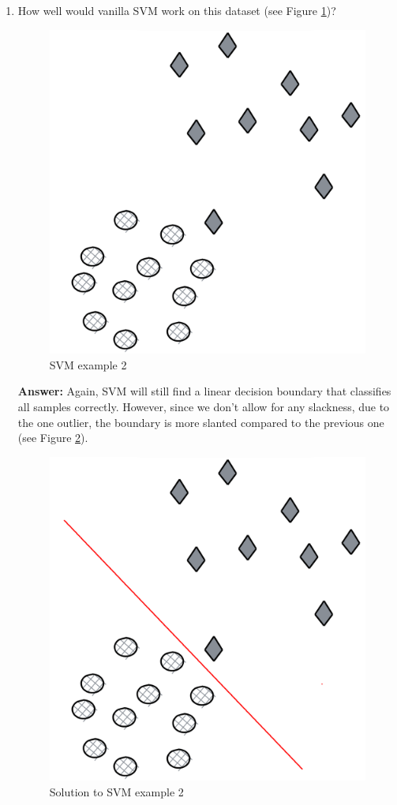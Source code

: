 \documentclass{article}
\newenvironment{QandA}{\begin{enumerate}[label=\arabic*.]}{\end{enumerate}}
\newenvironment{InnerQandA}{\begin{enumerate}[label=\roman*.]}{\end{enumerate}}
\newenvironment{answer}{\par\normalfont \textbf{Answer:}}{}
\begin{document}
\begin{QandA}
\begin{InnerQandA}
        \item How well would vanilla SVM work on this dataset (see Figure \ref{fig:svm-example-2})?
        \begin{figure}[htb!]
            \centering
            \includegraphics[width=0.3\columnwidth]{img/svm-example-2.png}
            \caption{SVM example 2}
            \label{fig:svm-example-2}
        \end{figure}
        \begin{answer}
            Again, SVM will still find a linear decision boundary that classifies all samples correctly. However, since we don't allow for any slackness, due to the one outlier, the boundary is more slanted compared to the previous one (see Figure \ref{fig:-sol-svm-example-2}). 
            \begin{figure}[htb!]
                \centering
                \includegraphics[width=0.3\columnwidth]{img/sol-svm-example-2.png}
                \caption{Solution to SVM example 2}
                \label{fig:-sol-svm-example-2}
            \end{figure}
        \end{answer}


\end{InnerQandA}
\end{QandA}
\end{document}
